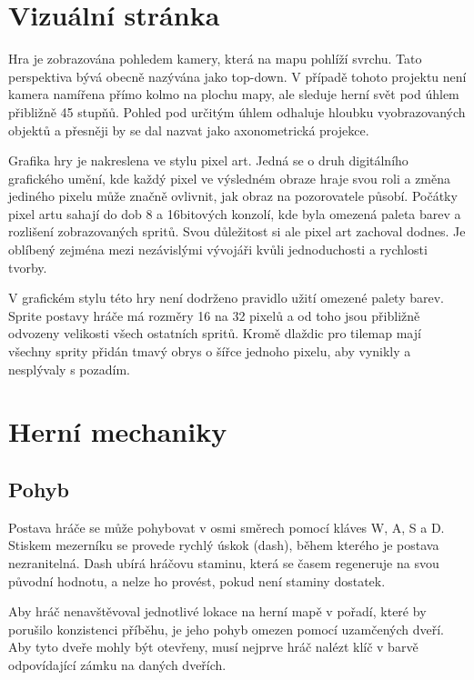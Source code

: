 \documentclass[FM,Proj,bw]{tulthesis}
\begin{document}
	\section{Vizuální stránka}
	
	Hra je zobrazována pohledem kamery, která na mapu pohlíží svrchu. Tato perspektiva bývá obecně nazývána jako top-down. V případě tohoto projektu není kamera namířena přímo kolmo na plochu mapy, ale sleduje herní svět pod úhlem přibližně 45 stupňů. Pohled pod určitým úhlem odhaluje hloubku vyobrazovaných objektů a přesněji by se dal nazvat jako axonometrická projekce.
	\cite{MatejJan}
	
	Grafika hry je nakreslena ve stylu pixel art. Jedná se o druh digitálního grafického umění, kde každý pixel ve výsledném obraze hraje svou roli a změna jediného pixelu může značně ovlivnit, jak obraz na pozorovatele působí. Počátky pixel artu sahají do dob 8 a 16bitových konzolí, kde byla omezená paleta barev a rozlišení zobrazovaných spritů. Svou důležitost si ale pixel art zachoval dodnes. Je oblíbený zejména mezi nezávislými vývojáři kvůli jednoduchosti a rychlosti tvorby.
	\cite{pixelArt}
	
	V grafickém stylu této hry není dodrženo pravidlo užití omezené palety barev. Sprite postavy hráče má rozměry 16 na 32 pixelů a od toho jsou přibližně odvozeny velikosti všech ostatních spritů. Kromě dlaždic pro tilemap mají všechny sprity přidán tmavý obrys o šířce jednoho pixelu, aby vynikly a nesplývaly s pozadím.
	
	\section{Herní mechaniky}
	
	\subsection{Pohyb} %
	
	Postava hráče se může pohybovat v osmi směrech pomocí kláves W, A, S a D. Stiskem mezerníku se provede rychlý úskok (dash), během kterého je postava nezranitelná. Dash ubírá hráčovu staminu, která se časem regeneruje na svou původní hodnotu, a nelze ho provést, pokud není staminy dostatek.
	
	Aby hráč nenavštěvoval jednotlivé lokace na herní mapě v pořadí, které by porušilo konzistenci příběhu, je jeho pohyb omezen pomocí uzamčených dveří. Aby tyto dveře mohly být otevřeny, musí nejprve hráč nalézt klíč v barvě odpovídající zámku na daných dveřích.
	
\end{document}
